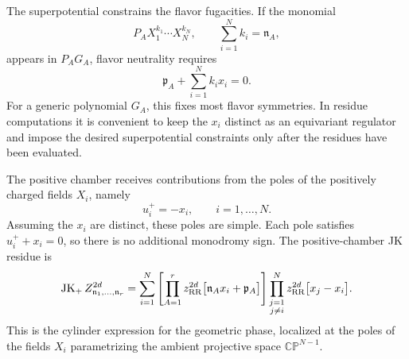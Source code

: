 \documentclass[11pt,a4paper]{article}
\numberwithin{equation}{section}
\theoremstyle{plain}
\theoremstyle{definition}
\theoremstyle{remark}
\begin{document}
The superpotential constrains the flavor fugacities. If the monomial
\begin{equation}
P_A X_1^{k_1}\cdots X_N^{k_N},
\qquad
\sum_{i=1}^{N}k_i=\mathfrak n_A,
\end{equation}
appears in \(P_A G_A\), flavor neutrality requires
\begin{equation}
\mathfrak p_A+\sum_{i=1}^{N}k_i x_i=0.
\end{equation}
For a generic polynomial \(G_A\), this fixes most flavor symmetries. In residue computations it is convenient to keep the \(x_i\) distinct as an equivariant regulator and impose the desired superpotential constraints only after the residues have been evaluated.

The positive chamber receives contributions from the poles of the positively charged fields \(X_i\), namely
\begin{equation}
u_i^+=-x_i,
\qquad
 i=1,\ldots,N.
\end{equation}
Assuming the \(x_i\) are distinct, these poles are simple. Each pole satisfies \(u_i^++x_i=0\), so there is no additional monodromy sign. The positive-chamber JK residue is
\begin{equation}
\operatorname{JK}_{+}
Z_{\mathfrak n_1,\ldots,\mathfrak n_r}^{2d}
=
\sum_{i=1}^{N}
\left[
\prod_{A=1}^{r}
z_{\rm RR}^{2d}\bigl[\mathfrak n_Ax_i+\mathfrak p_A\bigr]
\right]
\prod_{\substack{j=1\\ j\neq i}}^{N}
z_{\rm RR}^{2d}\bigl[x_j-x_i\bigr].
\label{eq:ci-JK-plus}
\end{equation}
This is the cylinder expression for the geometric phase, localized at the poles of the fields \(X_i\) parametrizing the ambient projective space \(\mathbb{CP}^{N-1}\).
\end{document}
